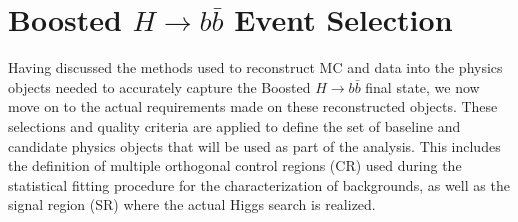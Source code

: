 \chapter{Boosted $H \rightarrow b\bar{b}$ Event Selection} \label{chap:selection}

Having discussed the methods used to reconstruct MC and data into the physics
objects needed to accurately capture the Boosted $H \rightarrow b\bar{b}$ final
state, we now move on to the actual requirements made on these reconstructed
objects.  These selections and quality criteria are applied to define the set
of baseline and candidate physics objects that will be used as part of the
analysis.  This includes the definition of multiple orthogonal control regions
(CR) used during the statistical fitting procedure for the characterization of
backgrounds, as well as the signal region (SR) where the actual Higgs search is
realized.



